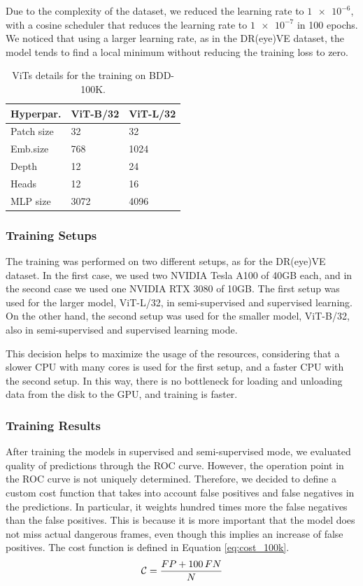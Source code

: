 Due to the complexity of the dataset, we reduced the learning rate to $\num{1e-6}$,
with a cosine scheduler that reduces the learning rate to $\num{1e-7}$ in 100 
epochs. We noticed that using a larger learning rate, as in the DR(eye)VE 
dataset, the model tends to find a local minimum without reducing the training 
loss to zero. 
\begin{table}[h]
    \vspace{0.5cm}
    \centering
    \begin{tabular}{lll}
    \hline
    \textbf{Hyperpar.} & \textbf{ViT-B/32} & \textbf{ViT-L/32} \\
    \hline
    Patch size & 32 & 32 \\
    \hline
    Emb.size & 768 & 1024 \\
    \hline
    Depth & 12 & 24 \\
    \hline
    Heads & 12 & 16 \\
    \hline
    MLP size & 3072 & 4096 \\
    \hline
    \end{tabular}
    \caption{ViTs details for the training on BDD-100K.}
    \label{tab:training_results}
\end{table}

\subsubsection{Training Setups}
The training was performed on two different setups, as for the DR(eye)VE dataset.
In the first case, we used two NVIDIA Tesla A100 of 40GB each, and in the second 
case we used one NVIDIA RTX 3080 of 10GB. The first setup was used for the larger 
model, ViT-L/32, in semi-supervised and supervised learning. On the other hand, 
the second setup was used for the smaller model, ViT-B/32, also in semi-supervised 
and supervised learning mode.

This decision helps to maximize the usage of the resources, considering that 
a slower CPU with many cores is used for the first setup, and a faster CPU with
the second setup. In this way, there is no bottleneck for loading and unloading 
data from the disk to the GPU, and training is faster.

\subsubsection{Training Results}
After training the models in supervised and semi-supervised mode, we evaluated 
quality of predictions through the ROC curve. However, the operation point in 
the ROC curve is not uniquely determined. Therefore, we decided to define a 
custom cost function that takes into account false positives and false negatives 
in the predictions. In particular, it weights hundred times more the false 
negatives than the false positives. This is because it is more important that 
the model does not miss actual dangerous frames, even though this implies an 
increase of false positives. The cost function is defined in Equation 
\ref{eq:cost_100k}.
\begin{equation}
    \centering
    \mathcal{C} = \frac{FP + 100 \, FN}{N}
    \label{eq:cost_100k}
\end{equation}

